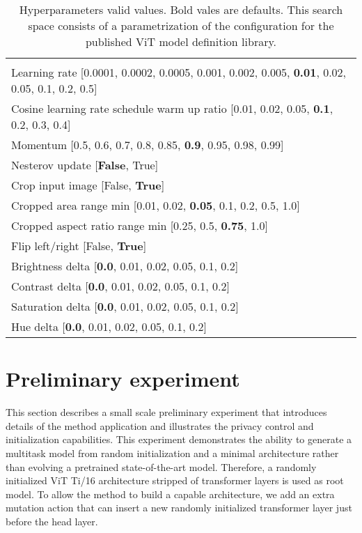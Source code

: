 \documentclass{article} \usepackage{iclr2023_conference,times}
\begin{document}
\begin{table}[t]
\vspace{-10pt}
  \caption{
Hyperparameters valid values.
Bold vales are defaults.
This search space consists of a parametrization of the configuration for the published ViT model definition library.
  }
\vspace{-6pt}
  \label{table:hps}
  \centering
  \begin{tabular}{l}
  \toprule
 [0.10, 0.12, 0.14, 0.16, 0.18, \textbf{0.20}, 0.22, 0.24, 0.26, 0.28, 0.30] \\
Learning rate  [0.0001, 0.0002, 0.0005, 0.001, 0.002, 0.005, \textbf{0.01}, 0.02, 0.05, 0.1, 0.2, 0.5] \\
Cosine learning rate schedule warm up ratio  [0.01, 0.02, 0.05, \textbf{0.1}, 0.2, 0.3, 0.4] \\
Momentum  [0.5, 0.6, 0.7, 0.8, 0.85, \textbf{0.9}, 0.95, 0.98, 0.99] \\
Nesterov update  [\textbf{False}, True] \\
Crop input image  [False, \textbf{True}] \\
Cropped area range min  [0.01, 0.02, \textbf{0.05}, 0.1, 0.2, 0.5, 1.0] \\
Cropped aspect ratio range min  [0.25, 0.5, \textbf{0.75}, 1.0] \\
Flip left/right  [False, \textbf{True}] \\
Brightness delta  [\textbf{0.0}, 0.01, 0.02, 0.05, 0.1, 0.2] \\
Contrast delta  [\textbf{0.0}, 0.01, 0.02, 0.05, 0.1, 0.2] \\
Saturation delta  [\textbf{0.0}, 0.01, 0.02, 0.05, 0.1, 0.2] \\
Hue delta  [\textbf{0.0}, 0.01, 0.02, 0.05, 0.1, 0.2] \\
\bottomrule
  \end{tabular}
\vspace{-10pt}
\end{table}

\section{Preliminary experiment}
\label{section:preliminary}

This section describes a small scale preliminary experiment that introduces details of the method application and illustrates the privacy control and initialization capabilities. 
This experiment demonstrates the ability to generate a multitask model from random initialization and a minimal architecture rather than evolving a pretrained state-of-the-art model.
Therefore, a randomly initialized ViT Ti/16 architecture \citep{Steiner2021HowTT} 
stripped of
transformer layers is used as root model.
To allow the method to build a capable architecture,
we add an extra mutation action that can insert a new randomly initialized transformer layer just before the head layer.
\end{document}
